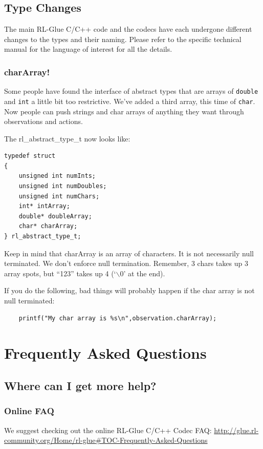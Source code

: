 \documentclass[11pt]{article}
\begin{document}
\subsection{Type Changes}
The main RL-Glue C/C++ code and the codecs have each undergone different changes to the types and their naming.
Please refer to the specific technical manual for the language of interest for all the details.

\subsubsection{charArray!}
Some people have found the interface of abstract types that are arrays of \texttt{double} and \texttt{int} a little bit too restrictive.  We've added a third array, this time of \texttt{char}.  Now people can push strings and char arrays of anything they want through observations and actions.

The rl\_abstract\_type\_t now looks like:
\begin{verbatim}
typedef struct
{
    unsigned int numInts;
    unsigned int numDoubles;
    unsigned int numChars;
    int* intArray;
    double* doubleArray;
    char* charArray;
} rl_abstract_type_t;
\end{verbatim}

Keep in mind that charArray is an array of characters.  It is not necessarily null terminated.  We don't enforce null termination. Remember, 3 chars takes up 3 array spots, but ``123'' takes up 4 (`$\backslash$0' at the end).

If you do the following, bad things will probably happen if the char array is not null terminated:
\begin{verbatim}
	printf("My char array is %s\n",observation.charArray);
\end{verbatim}

\section{Frequently Asked Questions}
\label{faq}
\subsection{Where can I get more help?}
\subsubsection{Online FAQ}
We suggest checking out the online RL-Glue C/C++ Codec FAQ:\newline
\url{http://glue.rl-community.org/Home/rl-glue#TOC-Frequently-Asked-Questions}
\end{document}
